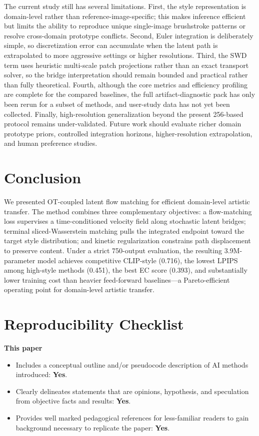﻿\documentclass[letterpaper]{article}
\begin{document}
The current study still has several limitations. First, the style representation is domain-level rather than reference-image-specific; this makes inference efficient but limits the ability to reproduce unique single-image brushstroke patterns or resolve cross-domain prototype conflicts. Second, Euler integration is deliberately simple, so discretization error can accumulate when the latent path is extrapolated to more aggressive settings or higher resolutions. Third, the SWD term uses heuristic multi-scale patch projections rather than an exact transport solver, so the bridge interpretation should remain bounded and practical rather than fully theoretical. Fourth, although the core metrics and efficiency profiling are complete for the compared baselines, the full artifact-diagnostic pack has only been rerun for a subset of methods, and user-study data has not yet been collected. Finally, high-resolution generalization beyond the present 256-based protocol remains under-validated. Future work should evaluate richer domain prototype priors, controlled integration horizons, higher-resolution extrapolation, and human preference studies.

\section{Conclusion}
We presented OT-coupled latent flow matching for efficient domain-level artistic transfer. The method combines three complementary objectives: a flow-matching loss supervises a time-conditioned velocity field along stochastic latent bridges; terminal sliced-Wasserstein matching pulls the integrated endpoint toward the target style distribution; and kinetic regularization constrains path displacement to preserve content. Under a strict 750-output evaluation, the resulting 3.9M-parameter model achieves competitive CLIP-style (0.716), the lowest LPIPS among high-style methods (0.451), the best EC score (0.393), and substantially lower training cost than heavier feed-forward baselines---a Pareto-efficient operating point for domain-level artistic transfer.

\FloatBarrier


\clearpage
\small
\setlength{\itemsep}{1pt}
\setlength{\parskip}{2pt}
\section*{Reproducibility Checklist}
\noindent\textbf{This paper}
\begin{itemize}
\item Includes a conceptual outline and/or pseudocode description of AI methods introduced: \textbf{Yes}.
\item Clearly delineates statements that are opinions, hypothesis, and speculation from objective facts and results: \textbf{Yes}.
\item Provides well marked pedagogical references for less-familiar readers to gain background necessary to replicate the paper: \textbf{Yes}.
\end{itemize}
\end{document}
